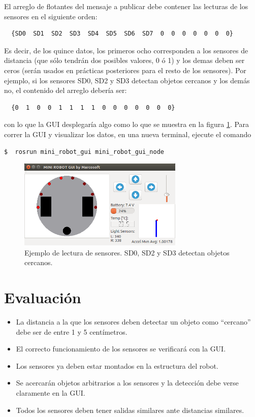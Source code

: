 \documentclass[a4paper,12pt]{article}
\begin{document}
El arreglo de flotantes del mensaje a publicar debe contener las lecturas de los sensores en el siguiente orden:
\begin{verbatim}
  {SD0  SD1  SD2  SD3  SD4  SD5  SD6  SD7  0  0  0  0  0  0  0}
\end{verbatim}

Es decir, de los quince datos, los primeros ocho corresponden a los sensores de distancia (que sólo tendrán dos posibles valores, 0 ó 1) y los demas deben ser ceros (serán usados en prácticas posteriores para el resto de los sensores). Por ejemplo, si los sensores SD0, SD2 y SD3 detectan objetos cercanos y los demás no, el contenido del arreglo debería ser:
\begin{verbatim}
  {0  1  0  0  1  1  1  1  0  0  0  0  0  0  0}
\end{verbatim}

con lo que la GUI desplegaría algo como lo que se muestra en la figura \ref{fig:Example}. Para correr la GUI y visualizar los datos, en una nueva terminal, ejecute el comando

\begin{lstlisting}[language=bash]
$  rosrun mini_robot_gui mini_robot_gui_node
\end{lstlisting}

\begin{figure}
  \centering
  \includegraphics[width=0.7\textwidth]{Figures/SensorExample.png}
  \caption{Ejemplo de lectura de sensores. SD0, SD2 y SD3 detectan objetos cercanos.}
  \label{fig:Example}
\end{figure}

\section{Evaluación}

\begin{itemize}
\item La distancia a la que los sensores deben detectar un objeto como ``cercano'' debe ser de entre 1 y 5 centímetros.
\item El correcto funcionamiento de los sensores se verificará con la GUI.
\item Los sensores ya deben estar montados en la estructura del robot.
\item Se acercarán objetos arbitrarios a los sensores y la detección debe verse claramente en la GUI.
\item Todos los sensores deben tener salidas similares ante distancias similares. 
\end{itemize}
\end{document}
